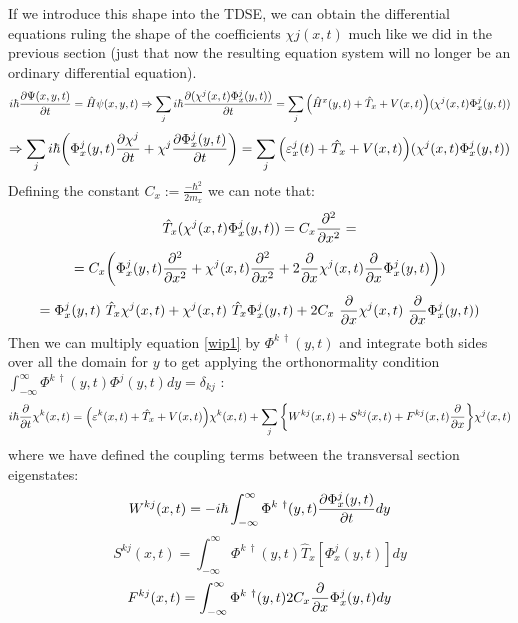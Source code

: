 \documentclass[11pt, a4paper]{article} %
\begin{document}
If we introduce this shape into the TDSE, we can obtain the differential equations ruling the shape of the coefficients $\chi j(x,t)$ much like we did in the previous section (just that now the resulting equation system will no longer be an ordinary differential equation).
\begin{equation}\label{wip1}
i\hbar \pdv{\Psi(x,y,t)}{t}=\hat{H}\psi(x,y,t)\Rightarrow \sum_j i\hbar \pdv{(\chi^j(x,t)\Phi^j_x(y,t))}{t}=\sum_j\qty(\hat{H}^x(y,t)+\hat{T}_x+V(x,t))(\chi^j(x,t)\Phi^j_x(y,t))
\end{equation}
$$
\Rightarrow \sum_j i\hbar\qty( \Phi^j_x(y,t)\pdv{\chi^j}{t} + \chi^j\pdv{\Phi^j_x(y,t)}{t}) = \sum_j\qty(\varepsilon^j_x(t)+\hat{T}_x+V(x,t))(\chi^j(x,t)\Phi^j_x(y,t))
$$
Defining the constant $C_x:=\frac{-\hbar^2}{2m_x}$ we can note that:\vspace{-0.1cm}
\begin{equation}
\hat{T}_x (\chi^j(x,t)\Phi^j_x(y,t)) = C_x\pdv[2]{}{x}(\chi^j(x,t)\Phi^j_x(y,t))=
\end{equation}
$$
=C_x\qty(\Phi^j_x(y,t)\pdv[2]{}{x}(\chi^j(x,t))+\chi^j(x,t)\pdv[2]{}{x}(\Phi^j_x(y,t)) +2 \pdv{}{x}\chi^j(x,t) \pdv{}{x}\Phi^j_x(y,t)))
$$
$$
=\Phi^j_x(y,t)\ \hat{T}_x \chi^j(x,t) + \chi^j(x,t)\  \hat{T}_x  \Phi^j_x(y,t) +2C_x\ \pdv{}{x}\chi^j(x,t)\ \pdv{}{x}\Phi^j_x(y,t))
$$
Then we can multiply equation \eqref{wip1} by $\Phi^{k\ \dagger}(y,t)$ and integrate both sides over all the domain for $y$ to get applying the orthonormality condition $\int_{-\infty}^{\infty}\Phi^{k\ \dagger}(y,t) \Phi^{j}(y,t) dy= \delta_{kj}$ :
\begin{equation}\label{DevEq}
i\hbar \pdv{}{t}\chi^k(x,t) = \qty( \varepsilon^k(x,t) + \hat{T}_x+V(x,t))\chi^k(x,t)+ \sum_j \qty{ W^{kj}(x,t) + S^{kj}(x,t)+F^{kj}(x,t)\pdv{}{x} } \chi^j(x,t) 
\end{equation}
where we have defined the coupling terms between the transversal section eigenstates:
\begin{equation}
W^{kj}(x,t) = -i\hbar\int_{-\infty}^{\infty}\Phi^{k\ \dagger}(y,t) \pdv{\Phi^j_x(y,t)}{t} dy
\end{equation}
\begin{equation}
S^{kj}(x,t) = \int_{-\infty}^{\infty}\Phi^{k\ \dagger}(y,t) \hat{T}_x [\Phi^j_x(y,t)] dy
\end{equation}
\begin{equation}
F^{kj}(x,t) = \int_{-\infty}^{\infty}\Phi^{k\ \dagger}(y,t) 2C_x \pdv{}{x}\Phi^j_x(y,t) dy
\end{equation}
\end{document}
